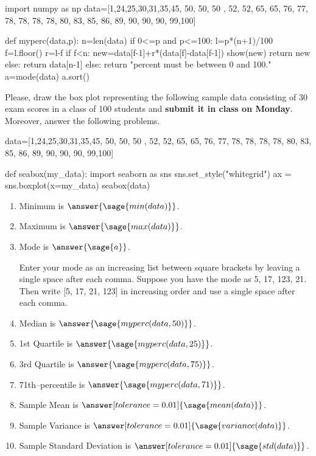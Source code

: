 \documentclass{ximera}
\begin{document}
\begin{problem}
\begin{sagesilent}
import numpy as np
data=[1,24,25,30,31,35,45, 50, 50, 50 , 52, 52, 65, 65, 76, 77, 78, 78, 78, 78, 80, 83, 85, 86, 89, 90, 90, 90, 99,100]

def myperc(data,p):
    n=len(data)
    if 0<=p and p<=100:
        l=p*(n+1)/100
        f=l.floor()
        r=l-f
        if f<n:
            new=data[f-1]+r*(data[f]-data[f-1])
            show(new)
            return new
        else:
            return data[n-1]
    else:
        return "percent must be between 0 and 100."
a=mode(data)
a.sort()
\end{sagesilent}
Please, draw the box plot representing the following sample data consisting of 30 exam scores in a class of 100 students and \textbf{submit it in class on Monday}. Moreover, answer the following problems.

\begin{sageOutput}
data=[1,24,25,30,31,35,45, 50, 50, 50 , 52, 52, 65, 65, 76, 77, 78, 78, 78, 78, 80, 83, 85, 86, 89, 90, 90, 90, 99,100]

def seabox(my_data):
    import seaborn as sns
    sns.set_style("whitegrid")
    ax = sns.boxplot(x=my_data)
seabox(data)
\end{sageOutput}

\begin{enumerate}
    \item Minimum is $\answer{\sage{min(data)}}$.
    \item Maximum is $\answer{\sage{max(data)}}$.
    \item Mode is $\answer{\sage{a}}$.
        \begin{hint}
        Enter your mode as an increasing list between square brackets by leaving a single space after each comma. 
        Suppose you have the mode as 5, 17, 123, 21. Then write {\color{red}[5, 17, 21, 123]} in increasing         order and use a single space after each comma.
        \end{hint}
    \item Median is $\answer{\sage{myperc(data,50)}}$.
    \item 1st Quartile is $\answer{\sage{myperc(data,25)}}$.
    \item 3rd Quartile is $\answer{\sage{myperc(data,75)}}$.
    \item 71th--percentile is $\answer{\sage{myperc(data,71)}}$.
    \item Sample Mean is $\answer[tolerance=0.01]{\sage{mean(data)}}$.
    \item Sample Variance is $\answer[tolerance=0.01]{\sage{variance(data)}}$.
    \item Sample Standard Deviation is $\answer[tolerance=0.01]{\sage{std(data)}}$.
\end{enumerate}
\end{problem}
\end{document}
